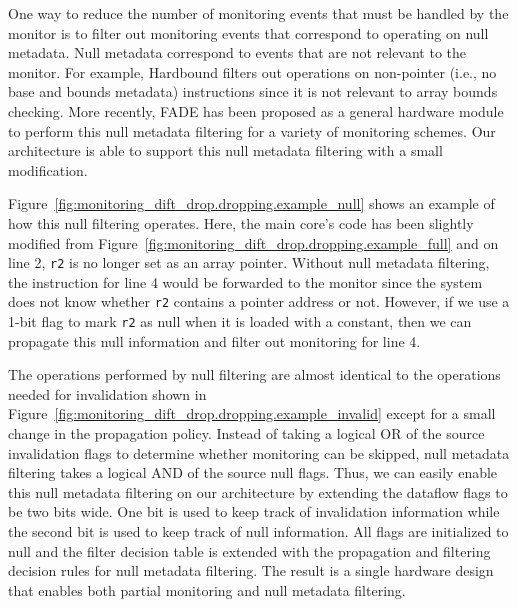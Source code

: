 One way to reduce the number of monitoring events that must be handled by the
monitor is to filter out monitoring events that correspond to operating on null
metadata. Null metadata correspond to events that are not relevant to the
monitor. For example, Hardbound \cite{hardbound-asplos08} filters out
operations on non-pointer (i.e., no base and bounds metadata) instructions
since it is not relevant to array bounds checking. More recently, FADE
\cite{fade-hpca14} has been proposed as a general hardware module to perform
this null metadata filtering for a variety of monitoring schemes. Our
architecture is able to support this null metadata filtering with a small
modification.

Figure~\ref{fig:monitoring_dift_drop.dropping.example_null} shows an example of
how this null filtering operates.  Here, the main core's code has been slightly
modified from Figure~\ref{fig:monitoring_dift_drop.dropping.example_full} and
on line 2, {\tt r2} is no longer set as an array pointer.  Without null
metadata filtering, the instruction for line 4 would be forwarded to the
monitor since the system does not know whether {\tt r2} contains a pointer
address or not. However, if we use a 1-bit flag to mark {\tt r2} as null when
it is loaded with a constant, then we can propagate this null information and
filter out monitoring for line 4.

The operations performed by null filtering are almost identical to the
operations needed for invalidation shown in
Figure~\ref{fig:monitoring_dift_drop.dropping.example_invalid} except for a
small change in the propagation policy. Instead of taking a logical OR of the
source invalidation flags to determine whether monitoring can be skipped, null
metadata filtering takes a logical AND of the source null flags.  Thus, we can
easily enable this null metadata filtering on our architecture by extending the
dataflow flags to be two bits wide. One bit is used to keep track of
invalidation information while the second bit is used to keep track of null
information. All flags are initialized to null and the filter decision table is
extended with the propagation and filtering decision rules for null metadata
filtering.  The result is a single hardware design that enables both partial
monitoring and null metadata filtering.

